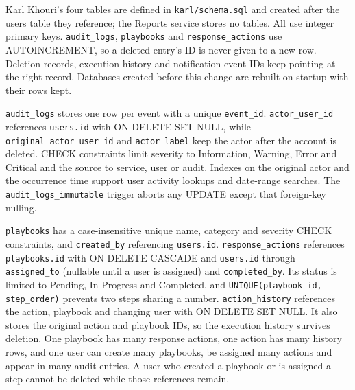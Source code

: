 Karl Khouri's four tables are defined in \texttt{karl/schema.sql} and created after the users table they reference; the Reports service stores no tables. All use integer primary keys. \texttt{audit\_logs}, \texttt{playbooks} and \texttt{response\_actions} use AUTOINCREMENT, so a deleted entry's ID is never given to a new row. Deletion records, execution history and notification event IDs keep pointing at the right record. Databases created before this change are rebuilt on startup with their rows kept.

\texttt{audit\_logs} stores one row per event with a unique \texttt{event\_id}. \texttt{actor\_user\_id} references \texttt{users.id} with ON DELETE SET NULL, while \texttt{original\_actor\_user\_id} and \texttt{actor\_label} keep the actor after the account is deleted. CHECK constraints limit severity to Information, Warning, Error and Critical and the source to service, user or audit. Indexes on the original actor and the occurrence time support user activity lookups and date-range searches. The \texttt{audit\_logs\_immutable} trigger aborts any UPDATE except that foreign-key nulling.

\texttt{playbooks} has a case-insensitive unique name, category and severity CHECK constraints, and \texttt{created\_by} referencing \texttt{users.id}. \texttt{response\_actions} references \texttt{playbooks.id} with ON DELETE CASCADE and \texttt{users.id} through \texttt{assigned\_to} (nullable until a user is assigned) and \texttt{completed\_by}. Its status is limited to Pending, In Progress and Completed, and \texttt{UNIQUE(playbook\_id, step\_order)} prevents two steps sharing a number. \texttt{action\_history} references the action, playbook and changing user with ON DELETE SET NULL. It also stores the original action and playbook IDs, so the execution history survives deletion. One playbook has many response actions, one action has many history rows, and one user can create many playbooks, be assigned many actions and appear in many audit entries. A user who created a playbook or is assigned a step cannot be deleted while those references remain.

